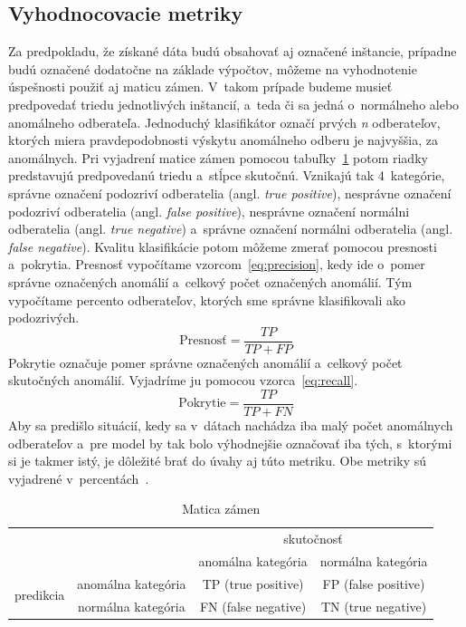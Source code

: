 \documentclass[a4paper,twoside,slovak,12pt,appendix]{article}
\begin{document}
\subsection{Vyhodnocovacie metriky}
Za predpokladu, že získané dáta budú obsahovať aj označené inštancie, prípadne
budú označené dodatočne na základe výpočtov, môžeme na vyhodnotenie úspešnosti
použiť aj maticu zámen. V~takom prípade budeme musieť predpovedať triedu
jednotlivých inštancií, a~teda či sa jedná o~normálneho alebo anomálneho
odberateľa. Jednoduchý klasifikátor označí prvých \textit{n} odberateľov,
ktorých miera pravdepodobnosti výskytu anomálneho odberu je najvyššia, za
anomálnych. Pri vyjadrení matice zámen pomocou
tabuľky~\ref{tab:confusion-matrix} potom riadky predstavujú predpovedanú triedu
a~stĺpce skutočnú. Vznikajú tak 4~kategórie, správne označení podozriví
odberatelia (angl. \textit{true positive}), nesprávne označení podozriví
odberatelia (angl. \textit{false positive}), nesprávne označení normálni
odberatelia (angl. \textit{true negative}) a~správne označení normálni
odberatelia (angl. \textit{false negative}). Kvalitu klasifikácie potom môžeme
zmerať pomocou presnosti a~pokrytia. Presnosť vypočítame
vzorcom~\ref{eq:precision}, kedy ide o~pomer správne označených anomálií
a~celkový počet označených anomálií. Tým vypočítame percento odberateľov,
ktorých sme správne klasifikovali ako podozrivých.
\begin{equation}
	\label{eq:precision}
  \text{Presnosť} = \frac{TP}{TP + FP}
\end{equation}
Pokrytie označuje pomer správne označených anomálií a~celkový počet skutočných
anomálií. Vyjadríme ju pomocou vzorca~\ref{eq:recall}.
\begin{equation}
	\label{eq:recall}
  \text{Pokrytie} = \frac{TP}{TP + FN}
\end{equation}
Aby sa predišlo situácií, kedy sa v~dátach nachádza iba malý počet anomálnych
odberateľov a~pre model by tak bolo výhodnejšie označovať iba tých, s~ktorými si
je takmer istý, je dôležité brať do úvahy aj túto metriku. Obe metriky sú
vyjadrené v~percentách~\cite{Trevizan2015,Wei2006}.

\begin{table}[htbp]
	\centering
	\caption{Matica zámen}
	\label{tab:confusion-matrix}
	\begin{tabular}{|c|c|c|c|}
		\hline
		\multicolumn{2}{|c|}{\multirow{2}{*}{}} 									 & \multicolumn{2}{c|}{skutočnosť} 							 \\ \cline{3-4}
		\multicolumn{2}{|c|}{}       									      			 &  anomálna kategória   &  normálna kategória   \\ \hline
		\multirow{2}{*}[1.2pt]{predikcia}   &  anomálna kategória  &  TP (true positive)   &  FP (false positive)  \\ \cline{2-4}
																				&  normálna kategória  &  FN (false negative)  &  TN (true negative)   \\ \hline
	\end{tabular}
\end{table}
\end{document}
